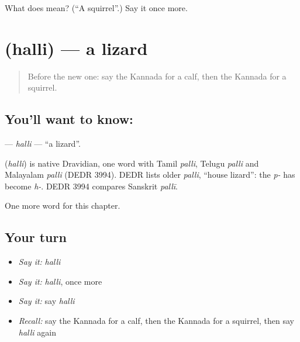 \begin{tcolorbox}[breakable,colback=teal!4,colframe=teal!35!black,title={Before you move on}]
What does  mean? (\textquotedblleft{}A squirrel\textquotedblright{}.) Say it once more.
\end{tcolorbox}
\section[\texorpdfstring{\kn{ಹಲ್ಲಿ} (halli)}{ಹಲ್ಲಿ (halli)}]{ (halli) — a lizard}

\label{lesson:KA-C261-halli}



\begin{quote}
Before the new one: say the Kannada for a calf, then the Kannada for a squirrel.
\end{quote}

\subsection*{You'll want to know: }
\textbf{} — \emph{halli} — \textquotedblleft{}a lizard\textquotedblright{}.

\begin{cousinweb}
\textbf{} (\emph{halli}) is native Dravidian, one word with Tamil \emph{palli}, Telugu \emph{palli} and Malayalam \emph{palli} (DEDR 3994). DEDR lists older \emph{palli}, \textquotedblleft{}house lizard\textquotedblright{}: the \emph{p-} has become \emph{h-}. DEDR 3994 compares Sanskrit \emph{pallī}.
\end{cousinweb}

\begin{grammarlens}[title={What you've built}]
One more word for this chapter.
\end{grammarlens}

\subsection*{Your turn}
\begin{itemize}
\raggedright
  \item \emph{Say it:} \emph{halli}
  \item \emph{Say it:} \emph{halli}, once more
  \item \emph{Say it:} say \emph{halli}
  \item \emph{Recall:} say the Kannada for a calf, then the Kannada for a squirrel, then say \emph{halli} again
\end{itemize}

